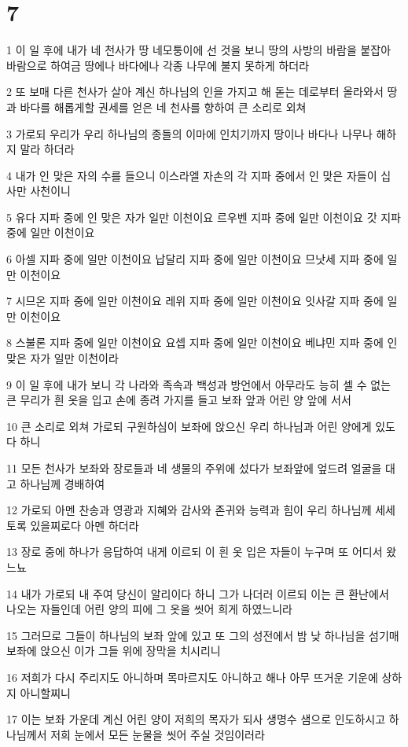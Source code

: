 \chapter{7}

\par 1 이 일 후에 내가 네 천사가 땅 네모퉁이에 선 것을 보니 땅의 사방의 바람을 붙잡아 바람으로 하여금 땅에나 바다에나 각종 나무에 불지 못하게 하더라
\par 2 또 보매 다른 천사가 살아 계신 하나님의 인을 가지고 해 돋는 데로부터 올라와서 땅과 바다를 해롭게할 권세를 얻은 네 천사를 향하여 큰 소리로 외쳐
\par 3 가로되 우리가 우리 하나님의 종들의 이마에 인치기까지 땅이나 바다나 나무나 해하지 말라 하더라
\par 4 내가 인 맞은 자의 수를 들으니 이스라엘 자손의 각 지파 중에서 인 맞은 자들이 십 사만 사천이니
\par 5 유다 지파 중에 인 맞은 자가 일만 이천이요 르우벤 지파 중에 일만 이천이요 갓 지파 중에 일만 이천이요
\par 6 아셀 지파 중에 일만 이천이요 납달리 지파 중에 일만 이천이요 므낫세 지파 중에 일만 이천이요
\par 7 시므온 지파 중에 일만 이천이요 레위 지파 중에 일만 이천이요 잇사갈 지파 중에 일만 이천이요
\par 8 스불론 지파 중에 일만 이천이요 요셉 지파 중에 일만 이천이요 베냐민 지파 중에 인 맞은 자가 일만 이천이라
\par 9 이 일 후에 내가 보니 각 나라와 족속과 백성과 방언에서 아무라도 능히 셀 수 없는 큰 무리가 흰 옷을 입고 손에 종려 가지를 들고 보좌 앞과 어린 양 앞에 서서
\par 10 큰 소리로 외쳐 가로되 구원하심이 보좌에 앉으신 우리 하나님과 어린 양에게 있도다 하니
\par 11 모든 천사가 보좌와 장로들과 네 생물의 주위에 섰다가 보좌앞에 엎드려 얼굴을 대고 하나님께 경배하여
\par 12 가로되 아멘 찬송과 영광과 지혜와 감사와 존귀와 능력과 힘이 우리 하나님께 세세토록 있을찌로다 아멘 하더라
\par 13 장로 중에 하나가 응답하여 내게 이르되 이 흰 옷 입은 자들이 누구며 또 어디서 왔느뇨
\par 14 내가 가로되 내 주여 당신이 알리이다 하니 그가 나더러 이르되 이는 큰 환난에서 나오는 자들인데 어린 양의 피에 그 옷을 씻어 희게 하였느니라
\par 15 그러므로 그들이 하나님의 보좌 앞에 있고 또 그의 성전에서 밤 낮 하나님을 섬기매 보좌에 앉으신 이가 그들 위에 장막을 치시리니
\par 16 저희가 다시 주리지도 아니하며 목마르지도 아니하고 해나 아무 뜨거운 기운에 상하지 아니할찌니
\par 17 이는 보좌 가운데 계신 어린 양이 저희의 목자가 되사 생명수 샘으로 인도하시고 하나님께서 저희 눈에서 모든 눈물을 씻어 주실 것임이러라

